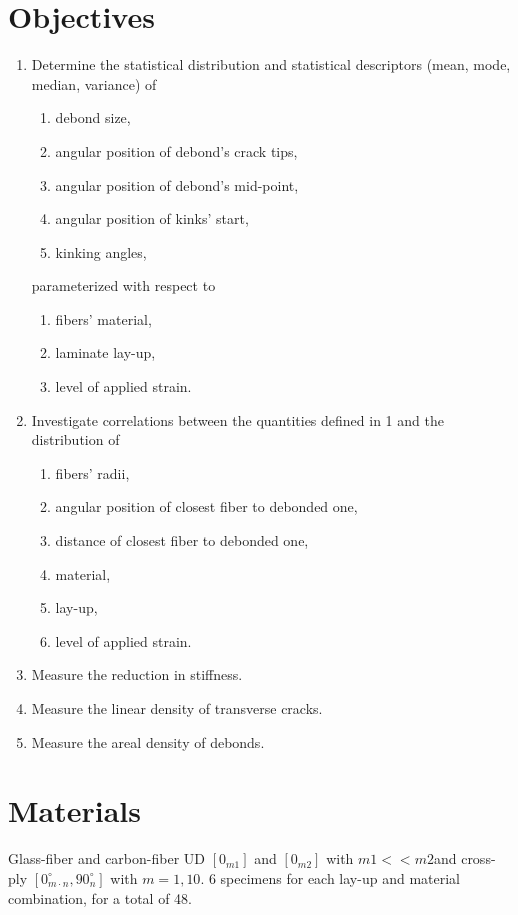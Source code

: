 \documentclass[review]{elsarticle}
\begin{document}
\section{Objectives}
\begin{enumerate}
\item Determine the statistical distribution and statistical descriptors (mean, mode, median, variance) of
\begin{enumerate}[label=\alph*]
\item debond size,
\item angular position of debond's crack tips,
\item angular position of debond's mid-point,
\item angular position of kinks' start,
\item kinking angles,
\end{enumerate}
parameterized with respect to
\begin{enumerate}[label=\alph*]
\item fibers' material,
\item laminate lay-up,
\item level of applied strain.
\end{enumerate}

\item Investigate correlations between the quantities defined in 1 and the distribution of
\begin{enumerate}[label=\alph*]
\item fibers' radii,
\item angular position of closest fiber to debonded one,
\item distance of closest fiber to debonded one,
\item material,
\item lay-up,
\item level of applied strain.
\end{enumerate}

\item Measure the reduction in stiffness.
\item Measure the linear density of transverse cracks.
\item Measure the areal density of debonds.

\end{enumerate}

\section{Materials}
Glass-fiber and carbon-fiber UD $[0_{m1}]$ and $[0_{m2}]$ with $m1<<m2$and cross-ply $[0_{m\cdot n}^{\circ},90_{n}^{\circ}]$ with $m=1,10$. 6 specimens for each lay-up and material combination, for a total of 48.
\end{document}
